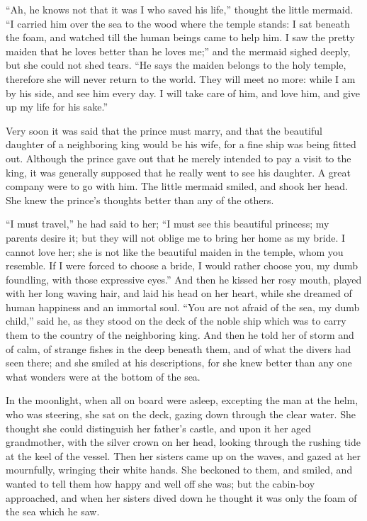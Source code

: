 ``Ah, he knows not that it was I who saved his life,'' thought the little mermaid.
``I carried him over the sea to the wood where the temple stands: I sat beneath the foam, and watched till the human beings came to help him.
I saw the pretty maiden that he loves better than he loves me;'' and the mermaid sighed deeply, but she could not shed tears.
``He says the maiden belongs to the holy temple, therefore she will never return to the world.
They will meet no more: while I am by his side, and see him every day.
I will take care of him, and love him, and give up my life for his sake.''

Very soon it was said that the prince must marry, and that the beautiful daughter of a neighboring king would be his wife, for a fine ship was being fitted out.
Although the prince gave out that he merely intended to pay a visit to the king, it was generally supposed that he really went to see his daughter.
A great company were to go with him.
The little mermaid smiled, and shook her head.
She knew the prince’s thoughts better than any of the others.

``I must travel,'' he had said to her; ``I must see this beautiful princess; my parents desire it; but they will not oblige me to bring her home as my bride.
I cannot love her; she is not like the beautiful maiden in the temple, whom you resemble.
If I were forced to choose a bride, I would rather choose you, my dumb foundling, with those expressive eyes.'' And then he kissed her rosy mouth, played with her long waving hair, and laid his head on her heart, while she dreamed of human happiness and an immortal soul.
``You are not afraid of the sea, my dumb child,'' said he, as they stood on the deck of the noble ship which was to carry them to the country of the neighboring king.
And then he told her of storm and of calm, of strange fishes in the deep beneath them, and of what the divers had seen there; and she smiled at his descriptions, for she knew better than any one what wonders were at the bottom of the sea.

In the moonlight, when all on board were asleep, excepting the man at the helm, who was steering, she sat on the deck, gazing down through the clear water.
She thought she could distinguish her father’s castle, and upon it her aged grandmother, with the silver crown on her head, looking through the rushing tide at the keel of the vessel.
Then her sisters came up on the waves, and gazed at her mournfully, wringing their white hands.
She beckoned to them, and smiled, and wanted to tell them how happy and well off she was; but the cabin-boy approached, and when her sisters dived down he thought it was only the foam of the sea which he saw.

